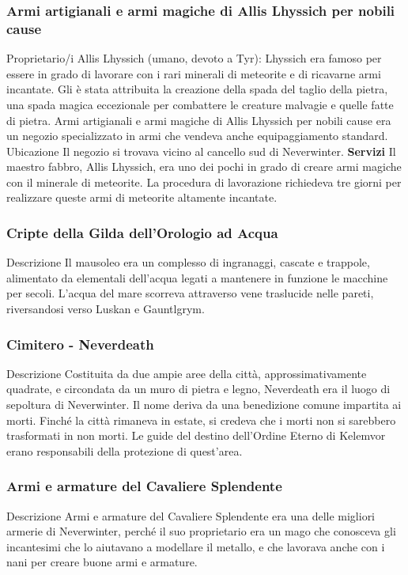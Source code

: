 \documentclass{article}
\begin{document}
              \subsubsection{Armi artigianali e armi magiche di Allis Lhyssich per nobili cause}
Proprietario/i
Allis Lhyssich (umano, devoto a Tyr): Lhyssich era famoso per essere in grado di lavorare con i rari minerali di meteorite e di ricavarne armi incantate. Gli è stata attribuita la creazione della spada del taglio della pietra, una spada magica eccezionale per combattere le creature malvagie e quelle fatte di pietra.\newline
Armi artigianali e armi magiche di Allis Lhyssich per nobili cause era un negozio specializzato in armi che vendeva anche equipaggiamento standard.
Ubicazione
Il negozio si trovava vicino al cancello sud di Neverwinter.
\textbf{Servizi}
Il maestro fabbro, Allis Lhyssich, era uno dei pochi in grado di creare armi magiche con il minerale di meteorite. La procedura di lavorazione richiedeva tre giorni per realizzare queste armi di meteorite altamente incantate.
              \subsubsection{Cripte della Gilda dell'Orologio ad Acqua}
Descrizione
Il mausoleo era un complesso di ingranaggi, cascate e trappole, alimentato da elementali dell'acqua legati a mantenere in funzione le macchine per secoli. L'acqua del mare scorreva attraverso vene traslucide nelle pareti, riversandosi verso Luskan e Gauntlgrym.
              \subsubsection{Cimitero - Neverdeath}
Descrizione
Costituita da due ampie aree della città, approssimativamente quadrate, e circondata da un muro di pietra e legno, Neverdeath era il luogo di sepoltura di Neverwinter. Il nome deriva da una benedizione comune impartita ai morti. Finché la città rimaneva in estate, si credeva che i morti non si sarebbero trasformati in non morti.
Le guide del destino dell'Ordine Eterno di Kelemvor erano responsabili della protezione di quest'area.
              \subsubsection{Armi e armature del Cavaliere Splendente}
Descrizione
Armi e armature del Cavaliere Splendente era una delle migliori armerie di Neverwinter, perché il suo proprietario era un mago che conosceva gli incantesimi che lo aiutavano a modellare il metallo, e che lavorava anche con i nani per creare buone armi e armature.
\end{document}
